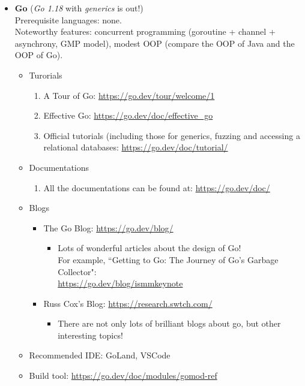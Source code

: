 \documentclass{article}
\begin{document}
\begin{itemize}
    \item \textbf{Go} (\emph{Go 1.18} with \emph{generics} is out!)\\
    Prerequisite languages: none.\\
    Noteworthy features: concurrent programming (goroutine + channel + asynchrony, GMP model), modest OOP (compare the OOP of Java and the OOP of Go).
    \begin{itemize}
        \item Turorials
        \begin{enumerate}
            \item A Tour of Go:
            \href{https://go.dev/tour/welcome/1}{https://go.dev/tour/welcome/1}
            \item Effective Go:
            \href{https://go.dev/doc/effective\_go}{https://go.dev/doc/effective\_go}
            \item Official tutorials (including those for generics, fuzzing and accessing a relational databases:
            \href{https://go.dev/doc/tutorial/}{https://go.dev/doc/tutorial/}
        \end{enumerate}
        \item Documentations
        \begin{enumerate}
            \item All the documentations can be found at:
            \href{https://go.dev/doc/}{https://go.dev/doc/}
        \end{enumerate}
        \item Blogs
        \begin{itemize}
            \item The Go Blog:
            \href{https://go.dev/blog/}{https://go.dev/blog/}
            \begin{itemize}
                \item Lots of wonderful articles about the design of Go!\\
                For example, ``Getting to Go: The Journey of Go's Garbage Collector":\\
                \href{https://go.dev/blog/ismmkeynote}{https://go.dev/blog/ismmkeynote}
            \end{itemize}    
            \item Russ Cox's Blog:
            \href{https://research.swtch.com/}{https://research.swtch.com/}
            \begin{itemize}
                \item There are not only lots of brilliant blogs about go, but other interesting topics!
            \end{itemize}
        \end{itemize}
        \item Recommended IDE: GoLand, VSCode
        \item Build tool:
        \href{https://go.dev/doc/modules/gomod-ref}{https://go.dev/doc/modules/gomod-ref}
    \end{itemize}
    

\end{itemize}
\end{document}
